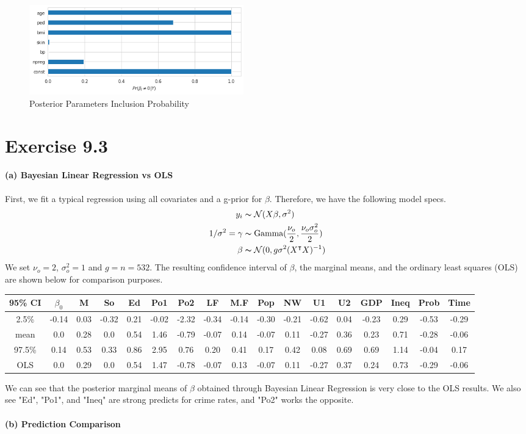 \documentclass[11pt, letterpaper]{article}
\begin{document}
\begin{figure}[!h]
  \centering
  \includegraphics[width=0.45\textwidth]{2.1.png}
  \captionsetup{justification=centering}
  \caption{Posterior Parameters Inclusion Probability}
  \label{fig:ex9.2_ppip}
\end{figure}


\newpage
\section{Exercise 9.3}
\paragraph{(a) Bayesian Linear Regression vs OLS}
First, we fit a typical regression using all covariates and a g-prior for $\beta$. Therefore, we have the following model specs.
\begin{align*}
    y_i &\thicksim \mathcal{N}(X\beta, \sigma^2) \\
    1/\sigma^2 = \gamma &\thicksim \text{Gamma}(\frac{\nu_o}{2}, \frac{\nu_o\sigma_o^2}{2}) \\
    \beta &\thicksim \mathcal{N}(0, g\sigma^2(X^{\intercal}X)^{-1})
\end{align*}
We set $\nu_o = 2$, $\sigma^2_o = 1$ and $g = n = 532$. The resulting confidence interval of $\beta$, the marginal means, and the ordinary least squares (OLS) are shown below for comparison purposes.

\begin{center}
\footnotesize
\begin{tabular}{||c|c c c c c c c c c c c c c c c c||}
\hline
95\% CI & $\beta_0$ & M & So & Ed & Po1 & Po2 & LF & M.F & Pop & NW & U1 & U2 & GDP & Ineq & Prob & Time \\
\hline\hline
2.5\% & -0.14 & 0.03 & -0.32 & 0.21 & -0.02 & -2.32 & -0.34 & -0.14 & -0.30 & -0.21 & -0.62 & 0.04 & -0.23 & 0.29 & -0.53 & -0.29 \\
mean & 0.0 & 0.28 & 0.0 & 0.54 & 1.46 & -0.79 & -0.07 & 0.14 & -0.07 & 0.11 & -0.27 & 0.36 & 0.23 & 0.71 & -0.28 & -0.06 \\
97.5\% & 0.14 & 0.53 & 0.33 & 0.86 & 2.95 & 0.76 & 0.20 & 0.41 & 0.17 & 0.42 & 0.08 & 0.69 & 0.69 & 1.14 & -0.04 & 0.17 \\
OLS & 0.0 & 0.29 & 0.0 & 0.54 & 1.47 & -0.78 & -0.07 & 0.13 & -0.07 & 0.11 & -0.27 & 0.37 & 0.24 & 0.73 & -0.29 & -0.06 \\
\hline
\end{tabular}
\end{center}
We can see that the posterior marginal means of $\beta$ obtained through Bayesian Linear Regression is very close to the OLS results. We also see "Ed", "Po1", and "Ineq" are strong predicts for crime rates, and "Po2" works the opposite.

\paragraph{(b) Prediction Comparison}
\end{document}
